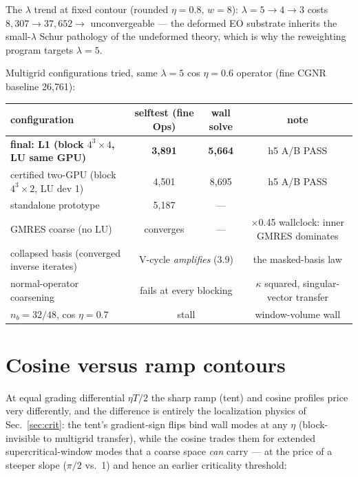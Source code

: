 \documentclass[11pt]{article}
\begin{document}
The $\lambda$ trend at fixed contour (rounded $\eta=0.8$, $w=8$):
$\lambda = 5 \to 4 \to 3$ costs $8{,}307 \to 37{,}652 \to$
unconvergeable --- the deformed EO substrate inherits the small-$\lambda$
Schur pathology of the undeformed theory, which is why the reweighting
program targets $\lambda = 5$.

Multigrid configurations tried, same $\lambda{=}5$ cos $\eta{=}0.6$
operator (fine CGNR baseline 26{,}761):

\begin{center}
\begin{tabular}{lccc}
\toprule
configuration & selftest (fine Ops) & wall solve & note \\
\midrule
\textbf{final: L1 (block $4^3\times4$, LU same GPU)} & \textbf{3{,}891} & \textbf{5{,}664} & h5 A/B PASS \\
certified two-GPU (block $4^3\times2$, LU dev 1) & 4{,}501 & 8{,}695 & h5 A/B PASS \\
standalone prototype & 5{,}187 & --- & \\
GMRES coarse (no LU) & converges & --- & $\times$0.45 wallclock: inner GMRES dominates \\
collapsed basis (converged inverse iterates) & \multicolumn{2}{c}{V-cycle \emph{amplifies} ($3.9$)} & the masked-basis law \\
normal-operator coarsening & \multicolumn{2}{c}{fails at every blocking} & $\kappa$ squared, singular-vector transfer \\
$n_b = 32/48$, cos $\eta = 0.7$ & \multicolumn{2}{c}{stall} & window-volume wall \\
\bottomrule
\end{tabular}
\end{center}

\section{Cosine versus ramp contours}
\label{sec:cosramp}
At equal grading differential $\eta T/2$ the sharp ramp (tent) and
cosine profiles price very differently, and the difference is entirely
the localization physics of Sec.~\ref{sec:crit}: the tent's
gradient-sign flips bind wall modes at any $\eta$ (block-invisible to
multigrid transfer), while the cosine trades them for extended
supercritical-window modes that a coarse space \emph{can} carry ---
at the price of a steeper slope ($\pi/2$ vs.\ 1) and hence an earlier
criticality threshold:
\end{document}
